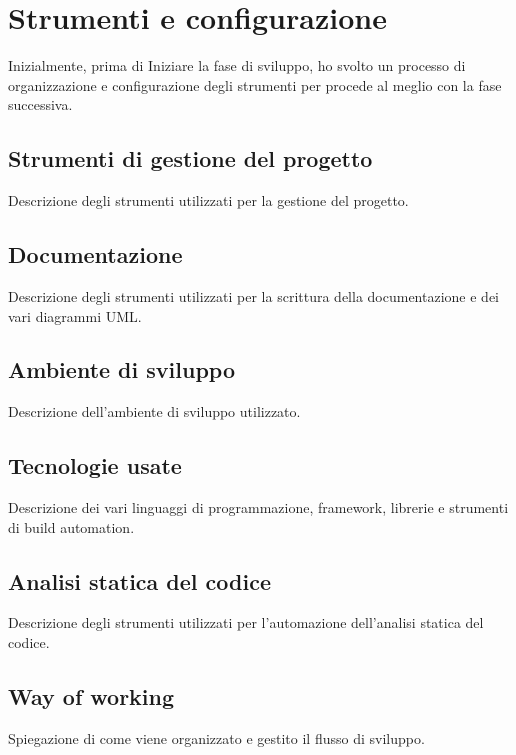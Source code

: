
\section{Strumenti e configurazione}
Inizialmente, prima di Iniziare la fase di sviluppo, ho svolto un processo di organizzazione e configurazione degli strumenti per procede al meglio con la fase successiva. 

\subsection{Strumenti di gestione del progetto}
Descrizione degli strumenti utilizzati per la gestione del progetto.

\subsection{Documentazione}
Descrizione degli strumenti utilizzati per la scrittura della documentazione e dei vari diagrammi UML.

\subsection{Ambiente di sviluppo}
Descrizione dell'ambiente di sviluppo utilizzato.

\subsection{Tecnologie usate}
Descrizione dei vari linguaggi di programmazione, framework, librerie e strumenti di build automation.

\subsection{Analisi statica del codice}
Descrizione degli strumenti utilizzati per l'automazione dell'analisi statica del codice.

\subsection{Way of working}
Spiegazione di come viene organizzato e gestito il flusso di sviluppo.
